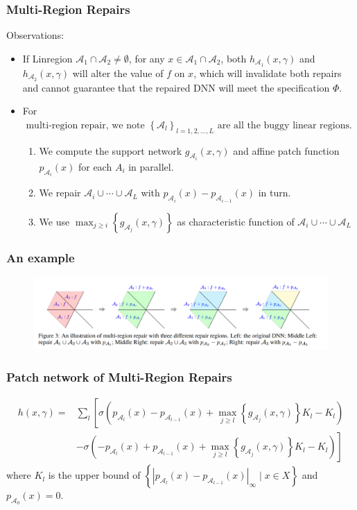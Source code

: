 \documentclass[aspectratio=169 %
,serif,mathserif]{beamer}
\begin{document}
\begin{frame}
	\frametitle{Multi-Region Repairs}
	Observations:
	\begin{itemize}
		\item If Linregion $\mathcal{A}_1 \cap \mathcal{A}_2 \neq \emptyset$, 
		for any $x \in \mathcal{A}_1 \cap \mathcal{A}_2$,
		both $h_{\mathcal{A}_1}(x, \gamma)$ and $h_{\mathcal{A}_2}(x, \gamma)$ will alter the value of $f$ on $x$, 
		which will invalidate both repairs and cannot guarantee that the repaired DNN will meet the specification $\Phi$. \pause
		\item For$ \text { multi-region repair, we note }\left\{\mathcal{A}_l\right\}_{l=1,2, \ldots, L} \text { are all the buggy linear regions. }$
		\begin{enumerate}
			\item We compute the support network $g_{\mathcal{A}_i}(x,\gamma)$ and affine patch function $p_{\mathcal{A}_i}(x)$ for each $A_i$ in parallel.
			\item We repair $\mathcal{A}_i \cup \cdots \cup\mathcal{A}_L$ with $p_{\mathcal{A}_i}(x)-p_{\mathcal{A}_{i-1}}(x)$ in turn.
			\item We use $\max _{j \geq i}\left\{g_{\mathcal{A}_j}(x, \gamma)\right\}$ as characteristic function of $\mathcal{A}_i \cup \cdots \cup\mathcal{A}_L$
		\end{enumerate}
	\end{itemize} 
	
\end{frame}


\begin{frame}
	\frametitle{An example}
	\begin{figure}[htbp]
		\includegraphics[width=\linewidth]{6.png}
	\end{figure}
\end{frame}

\begin{frame}
	\frametitle{Patch network of Multi-Region Repairs}
	\begin{equation}
		\begin{aligned}
		h(x, \gamma)= & \sum_l\left[\sigma\left(p_{\mathcal{A}_l}(x)-p_{\mathcal{A}_{l-1}}(x)+\max _{j \geq l}\left\{g_{\mathcal{A}_j}(x, \gamma)\right\} K_l-K_l\right)\right. \\
		& \left.-\sigma\left(-p_{\mathcal{A}_l}(x)+p_{\mathcal{A}_{l-1}}(x)+\max _{j \geq l}\left\{g_{\mathcal{A}_j}(x, \gamma)\right\} K_l-K_l\right)\right]
		\end{aligned}
	\end{equation}
	\qquad where $K_l$ is the upper bound of $\left\{\left|p_{\mathcal{A}_l}(x)-p_{\mathcal{A}_{l-1}}(x)\right|_{\infty} \mid x \in X\right\}$ and $p_{\mathcal{A}_0}(x)=0$.
\end{frame}
\end{document}
